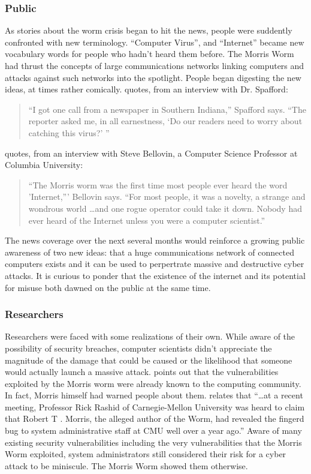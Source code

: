 \subsubsection*{Public}
As stories about the worm crisis began to hit the news, people were suddently
confronted with new terminology. ``Computer Virus'', and ``Internet'' became
new vocabulary words for people who hadn't heard them before. The Morris
Worm had thrust the concepts of large communications networks linking computers
and attacks against such networks into the spotlight. People began digesting the
new ideas, at times rather comically.
\cite{lee_washpost_2013} quotes, from an
interview with Dr. Spafford:
\begin{quote}
``I got one call from a newspaper in Southern Indiana,'' Spafford says. ``The
reporter asked me, in all earnestness, `Do our readers need to worry about
catching this virus?' ''
\end{quote}
\cite{marsan_morris_2008} quotes, from an
interview with Steve Bellovin, a Computer Science Professor at Columbia
University:
\begin{quote}
``The Morris worm was the first time most people ever heard the word 'Internet,'''
Bellovin says. ``For most people, it was a novelty, a strange and wondrous
world \ldots and one rogue operator could take it down. Nobody had ever heard
of the Internet unless you were a computer scientist.''
\end{quote}
The news coverage over the next several months would reinforce a growing public
awareness of two new ideas: that a huge communications network of connected
computers exists and it can be used to perpertrate massive and destructive
cyber attacks.
It is curious to ponder that the existence of the internet and its
potential for misuse both dawned on the public at the same time.
           	
\subsubsection*{Researchers}
Researchers were faced with some realizations of their own. While aware of the
possibility of security breaches, computer scientists didn't appreciate the
magnitude of the damage that could be caused or the likelihood that someone
would actually launch a massive attack. \cite{seeley_tour_1989} points out that
the vulnerabilities exploited by the Morris worm were already known to the
computing community. In fact, Morris himself had warned people about them.
\cite{spafford_internet_1989} relates that ``\ldots at a recent meeting, 
Professor Rick Rashid of Carnegie-Mellon University was heard to claim that
Robert T . Morris, the alleged author of the Worm, had revealed the fingerd
bug to system administrative staff at CMU well over a year ago.'' Aware of many
existing security vulnerabilities including the very vulnerabilities that
the Morris Worm exploited, system administrators still considered their risk
for a cyber attack to be miniscule. The Morris Worm showed them otherwise. 

